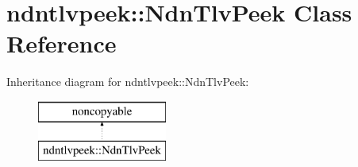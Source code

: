 \hypertarget{classndntlvpeek_1_1NdnTlvPeek}{}\section{ndntlvpeek\+:\+:Ndn\+Tlv\+Peek Class Reference}
\label{classndntlvpeek_1_1NdnTlvPeek}
Inheritance diagram for ndntlvpeek\+:\+:Ndn\+Tlv\+Peek\+:\begin{figure}[H]
\begin{center}
\leavevmode
\includegraphics[height=2.000000cm]{classndntlvpeek_1_1NdnTlvPeek}
\end{center}
\end{figure}
